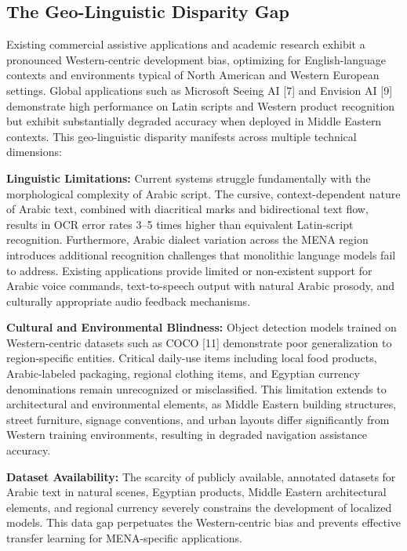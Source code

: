 \documentclass[a4paper]{report}
\begin{document}
\subsection{The Geo-Linguistic Disparity Gap}

Existing commercial assistive applications and academic research exhibit a pronounced Western-centric development bias, optimizing for English-language contexts and environments typical of North American and Western European settings. Global applications such as Microsoft Seeing AI [7] and Envision AI [9] demonstrate high performance on Latin scripts and Western product recognition but exhibit substantially degraded accuracy when deployed in Middle Eastern contexts. This geo-linguistic disparity manifests across multiple technical dimensions:

\textbf{Linguistic Limitations:} Current systems struggle fundamentally with the morphological complexity of Arabic script. The cursive, context-dependent nature of Arabic text, combined with diacritical marks and bidirectional text flow, results in OCR error rates 3--5 times higher than equivalent Latin-script recognition. Furthermore, Arabic dialect variation across the MENA region introduces additional recognition challenges that monolithic language models fail to address. Existing applications provide limited or non-existent support for Arabic voice commands, text-to-speech output with natural Arabic prosody, and culturally appropriate audio feedback mechanisms.

\textbf{Cultural and Environmental Blindness:} Object detection models trained on Western-centric datasets such as COCO [11] demonstrate poor generalization to region-specific entities. Critical daily-use items including local food products, Arabic-labeled packaging, regional clothing items, and Egyptian currency denominations remain unrecognized or misclassified. This limitation extends to architectural and environmental elements, as Middle Eastern building structures, street furniture, signage conventions, and urban layouts differ significantly from Western training environments, resulting in degraded navigation assistance accuracy.

\textbf{Dataset Availability:} The scarcity of publicly available, annotated datasets for Arabic text in natural scenes, Egyptian products, Middle Eastern architectural elements, and regional currency severely constrains the development of localized models. This data gap perpetuates the Western-centric bias and prevents effective transfer learning for MENA-specific applications.
\end{document}
